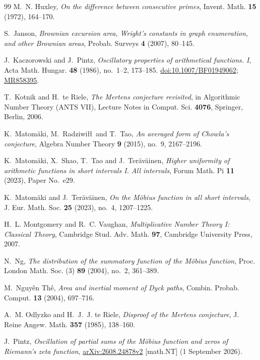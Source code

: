 \documentclass[11pt,reqno]{amsart}
\numberwithin{equation}{section}
\theoremstyle{plain}
\theoremstyle{definition}
\theoremstyle{remark}
\begin{document}
\begin{thebibliography}{99}
M.~N. Huxley, \emph{On the difference between consecutive primes}, Invent.
Math. \textbf{15} (1972), 164--170.

S.~Janson, \emph{Brownian excursion area, Wright's constants in graph
enumeration, and other Brownian areas}, Probab. Surveys \textbf{4} (2007),
80--145.

J.~Kaczorowski and J.~Pintz, \emph{Oscillatory properties of arithmetical
functions. I}, Acta Math. Hungar. \textbf{48} (1986), no.~1--2, 173--185.
\href{https://doi.org/10.1007/BF01949062}{doi:10.1007/BF01949062};
\href{https://mathscinet.ams.org/mathscinet-getitem?mr=858395}{MR858395}.

T.~Kotnik and H.~te Riele, \emph{The Mertens conjecture revisited}, in
Algorithmic Number Theory (ANTS VII), Lecture Notes in Comput. Sci.
\textbf{4076}, Springer, Berlin, 2006.

K.~Matom\"aki, M.~Radziwi\l\l\ and T.~Tao, \emph{An averaged form of Chowla's
conjecture}, Algebra Number Theory \textbf{9} (2015), no.~9, 2167--2196.

K.~Matom\"aki, X.~Shao, T.~Tao and J.~Ter\"av\"ainen, \emph{Higher uniformity
of arithmetic functions in short intervals I. All intervals}, Forum Math.
Pi \textbf{11} (2023), Paper No.~e29.

K.~Matom\"aki and J.~Ter\"av\"ainen, \emph{On the M\"obius function in all
short intervals}, J. Eur. Math. Soc. \textbf{25} (2023), no.~4, 1207--1225.

H.~L. Montgomery and R.~C. Vaughan, \emph{Multiplicative Number Theory I:
Classical Theory}, Cambridge Stud. Adv. Math. \textbf{97}, Cambridge
University Press, 2007.

N.~Ng, \emph{The distribution of the summatory function of the M\"obius
function}, Proc. London Math. Soc. (3) \textbf{89} (2004), no.~2, 361--389.

M.~Nguy\^en Th\^e, \emph{Area and inertial moment of Dyck paths}, Combin.
Probab. Comput. \textbf{13} (2004), 697--716.

A.~M. Odlyzko and H.~J.~J. te Riele, \emph{Disproof of the Mertens
conjecture}, J. Reine Angew. Math. \textbf{357} (1985), 138--160.

J.~Pintz, \emph{Oscillation of partial sums of the M\"obius function and
zeros of Riemann's zeta function}, \href{https://arxiv.org/abs/2608.24878v2}{arXiv:2608.24878v2} [math.NT] (1 September 2026).


\end{thebibliography}
\end{document}
